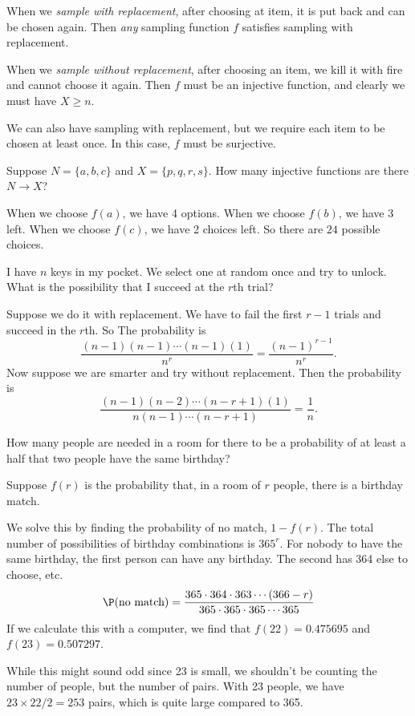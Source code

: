 \documentclass[a4paper]{article}
\begin{document}
\begin{defi}
  When we \emph{sample with replacement}, after choosing at item, it is put back and can be chosen again. Then \emph{any} sampling function $f$ satisfies sampling with replacement.
\end{defi}

\begin{defi}
  When we \emph{sample without replacement}, after choosing an item, we kill it with fire and cannot choose it again. Then $f$ must be an injective function, and clearly we must have $X \geq n$.
\end{defi}

We can also have sampling with replacement, but we require each item to be chosen at least once. In this case, $f$ must be surjective.

\begin{eg}
  Suppose $N = \{a, b, c\}$ and $X = \{p, q, r, s\}$. How many injective functions are there $N\to X$?

  When we choose $f(a)$, we have 4 options. When we choose $f(b)$, we have 3 left. When we choose $f(c)$, we have 2 choices left. So there are $24$ possible choices.
\end{eg}

\begin{eg}
  I have $n$ keys in my pocket. We select one at random once and try to unlock. What is the possibility that I succeed at the $r$th trial?

  Suppose we do it with replacement. We have to fail the first $r - 1$ trials and succeed in the $r$th. So The probability is
  \[
    \frac{(n - 1)(n - 1) \cdots (n - 1)(1)}{n^r} = \frac{(n - 1)^{r - 1}}{n^r}.
  \]
  Now suppose we are smarter and try without replacement. Then the probability is
  \[
    \frac{(n - 1)(n - 2)\cdots (n - r + 1)(1)}{n(n - 1) \cdots (n - r + 1)} = \frac{1}{n}.
  \]
\end{eg}
\begin{eg}
  How many people are needed in a room for there to be a probability of at least a half that two people have the same birthday?

  Suppose $f(r)$ is the probability that, in a room of $r$ people, there is a birthday match.

  We solve this by finding the probability of no match, $1 - f(r)$. The total number of possibilities of birthday combinations is $365^r$. For nobody to have the same birthday, the first person can have any birthday. The second has 364 else to choose, etc.
  \[
    \P(\text{no match}) = \frac{365\cdot 364\cdot 363 \cdots (366 - r)}{365\cdot 365\cdot 365 \cdots 365}
  \]
  If we calculate this with a computer, we find that $f(22) = 0.475695$ and $f(23) = 0.507297$.

  While this might sound odd since 23 is small, we shouldn't be counting the number of people, but the number of pairs. With 23 people, we have $23\times 22/2 = 253$ pairs, which is quite large compared to 365.
\end{eg}
\end{document}
